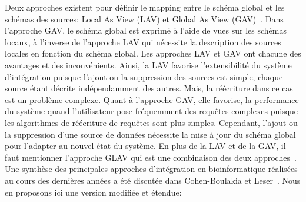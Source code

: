 Deux approches existent pour définir le mapping entre le schéma global et les schémas des sources: Local As View (LAV) et Global As View (GAV)~\cite{Halevy2001}. Dans l’approche GAV, le schéma global est exprimé à l’aide de vues sur les schémas locaux, à l’inverse de l’approche LAV qui nécessite la description des sources locales en fonction du schéma global. Les approches LAV et GAV ont chacune des avantages et des inconvénients. Ainsi, la  LAV   favorise l’extensibilité   du   système   d’intégration   puisque   l’ajout   ou   la   suppression   des   sources   est   simple,   chaque source   étant   décrite   indépendamment   des   autres.   Mais,  la   réécriture   dans   ce   cas   est   un   problème complexe.   Quant   à   l’approche   GAV,   elle   favorise,   la   performance   du   système   quand   l’utilisateur   pose fréquemment   des   requêtes   complexes   puisque   les   algorithmes   de   réécriture   de   requêtes   sont   plus   simples. Cependant, l’ajout ou la suppression d’une source de données nécessite la mise à jour du schéma global pour l’adapter au nouvel état du système. En plus de la LAV et de la GAV, il faut mentionner l’approche GLAV qui est une combinaison des deux approches~\cite{lenzerini2002}.\\


Une synthèse des principales approches d'intégration en bioinformatique réalisées au cours des dernières années a été discutée dans Cohen-Boulakia et Leser~\cite{cohen2010}. Nous en proposons ici une version modifiée et étendue:\\


